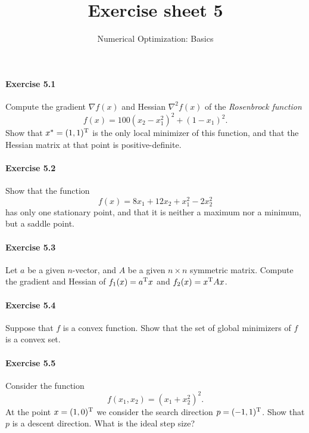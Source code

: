 
\title{Exercise sheet 5}
\subtitle{Numerical Optimization: Basics}

\maketitle

\paragraph{Exercise 5.1} %
Compute  the gradient $\nabla f(x)$ and Hessian $\nabla^2f(x)$ of the
\emph{Rosenbrock function}
\begin{equation}\label{eq:rosenbrock}
  f(x) = 100(x_2-x_1^2)^2 + (1-x_1)^2.
\end{equation}
Show that $x^*=(1,1)^{\text{\upshape T}}$ is the only local minimizer of this function, and
that the Hessian matrix at that point is positive-definite.

\paragraph{Exercise 5.2} %
Show that the function
\[
  f(x) = 8x_1 + 12x_2 + x_1^2 - 2x_2^2
\]
has only one stationary point, and that it is neither a maximum nor a minimum,
but a saddle point.

\paragraph{Exercise 5.3} %
Let $a$ be a given $n$-vector, and $A$ be a given $n\times n$ symmetric matrix. Compute the
gradient and Hessian of $f_1(x) = a^{\text{\upshape T}} x$ and $f_2 (x) =x^{\text{\upshape T}} Ax$.


\paragraph{Exercise 5.4} %
Suppose that $f$ is a convex function. Show that the set of global minimizers
of $f$ is a convex set.

\paragraph{Exercise 5.5} %
Consider the function
\[
  f(x_1, x_2) = (x_1+x_2^2)^2.
\]
At the point $x=(1,0)^{\text{\upshape T}}$ we consider the search direction $p=(-1,1)^{\text{\upshape T}}$.
Show that $p$ is a descent direction. What is the ideal step size?


